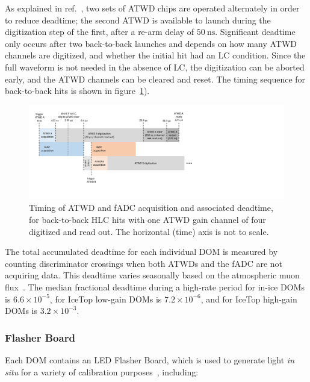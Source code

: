 As explained in ref.~\cite{ICECUBE:DAQ}, two sets of ATWD chips are
operated alternately in order to reduce deadtime; the second ATWD is
available to launch during the digitization step of the first,
after a re-arm delay of $50~\mathrm{ns}$.  Significant deadtime
only occurs after two back-to-back launches and depends on how many
ATWD channels are digitized, and whether the initial hit had an LC
condition.  Since the full waveform is not needed in the absence of LC, the
digitization can be aborted early, and the ATWD channels can be cleared and
reset.  The timing sequence for back-to-back hits is shown in
figure~\ref{fig:atwd_timing}).

\begin{figure}[]
 \centering
 \includegraphics[width=1.0\textwidth]{graphics/dom/functional/atwd_timing.pdf}
 \caption{Timing of ATWD and fADC acquisition and associated deadtime, for
   back-to-back HLC hits with one ATWD gain channel of four digitized and read out.  The
   horizontal (time) axis is not to scale.}
 \label{fig:atwd_timing}
\end{figure}

The total accumulated deadtime for each individual DOM is measured by counting
discriminator crossings when both ATWDs and the fADC are not acquiring
data. This deadtime varies seasonally based on the atmospheric muon
flux~\cite{ICECUBE:IceTop}.  The median fractional deadtime during a
high-rate period for in-ice DOMs 
is $6.6\times10^{-5}$, for IceTop low-gain DOMs is $7.2\times 10^{-6}$, and
for IceTop high-gain DOMs is $3.2 \times 10^{-3}$.

\subsubsection{\label{sec:flasher}Flasher Board}

Each DOM contains an LED Flasher Board, which is used to generate
light \emph{in situ} for a
variety of calibration purposes~\cite{IC3:SC,Aartsen:2013rt}, including: 

